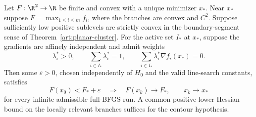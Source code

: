 \begin{corollary}\label{art:planar-max}
Let ${F:\R^2\to\R}$ be finite and convex with a unique minimizer $x_*$. Near
$x_*$ suppose $F=\max_{1\le i\le m}f_i$, where the branches are convex and
$C^2$. Suppose sufficiently low positive sublevels are strictly convex in
the boundary-segment sense of Theorem~\ref{art:planar-cluster}. For the
active set $I_*$ at $x_*$, suppose the gradients are affinely independent
and admit weights
\[
 \lambda_i^*>0,\qquad \sum_{i\in I_*}\lambda_i^*=1,
 \qquad \sum_{i\in I_*}\lambda_i^*\nabla f_i(x_*)=0.
\]
Then some $\varepsilon>0$, chosen independently of $H_0$ and the valid
line-search constants, satisfies
\[
 F(x_0)<F_*+\varepsilon
 \quad\Longrightarrow\quad F(x_k)\to F_*,\qquad x_k\to x_*
\]
for every infinite admissible full-BFGS run. A common positive lower Hessian
bound on the locally relevant branches suffices for the contour hypothesis.
\end{corollary}
